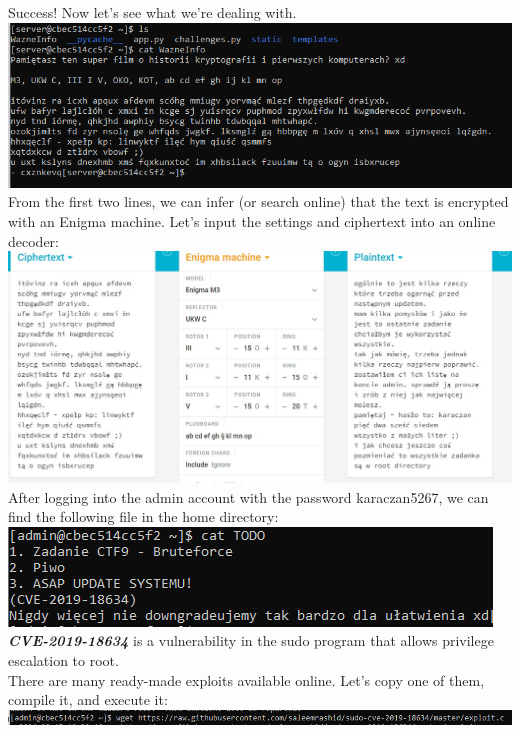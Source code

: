 \documentclass{article}
\begin{document}
Success! Now let’s see what we’re dealing with.
\vspace{3mm} \\
\includegraphics[width=\textwidth]{"image89.png"}
From the first two lines, we can infer (or search online) that the text is encrypted with an Enigma machine. Let’s input the settings and ciphertext into an online decoder:
\vspace{3mm} \\
\includegraphics[width=\textwidth]{"image90.jpeg"}
After logging into the admin account with the password karaczan5267, we can find the following file in the home directory:
\vspace{3mm} \\
\includegraphics[width=\textwidth]{"image91.png"}
\textbf{\textit{CVE-2019-18634}} is a vulnerability in the sudo program that allows privilege escalation to root.
\vspace{3mm} \\
There are many ready-made exploits available online. Let’s copy one of them, compile it, and execute it:
\vspace{3mm} \\
\includegraphics[width=\textwidth]{"image92.png"}
\end{document}
